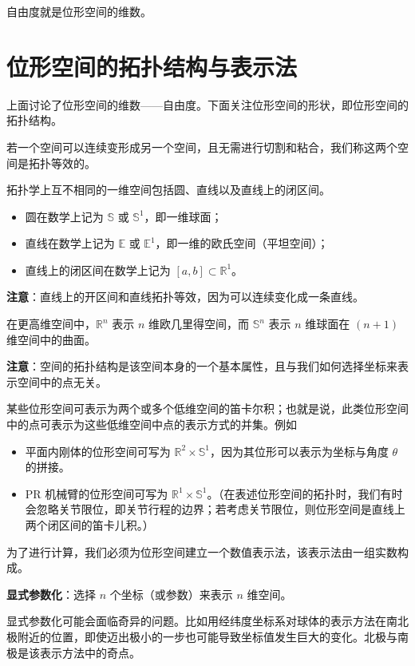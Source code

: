 自由度就是位形空间的维数。

\section{位形空间的拓扑结构与表示法}

上面讨论了位形空间的维数——自由度。下面关注位形空间的形状，即位形空间的拓扑结构。

\begin{definition}
	若一个空间可以连续变形成另一个空间，且无需进行切割和粘合，我们称这两个空间是拓扑等效的。
\end{definition}

拓扑学上互不相同的一维空间包括圆、直线以及直线上的闭区间。
\begin{itemize}
	\item 圆在数学上记为 $\mathbb{S}$ 或 $\mathbb{S}^{1}$，即一维球面；
	\item 直线在数学上记为 $\mathbb{E}$ 或 $\mathbb{E}^{1}$，即一维的欧氏空间（平坦空间）；
	\item 直线上的闭区间在数学上记为 $[a,b]\subset\mathbb{R}^{1}$。
\end{itemize}

\textbf{注意}：直线上的开区间和直线拓扑等效，因为可以连续变化成一条直线。

在更高维空间中，$\mathbb{R}^{n}$ 表示 $n$ 维欧几里得空间，而 $\mathbb{S}^{n}$ 表示 $n$ 维球面在 $(n+1)$ 维空间中的曲面。

\textbf{注意}：空间的拓扑结构是该空间本身的一个基本属性，且与我们如何选择坐标来表示空间中的点无关。

某些位形空间可表示为两个或多个低维空间的笛卡尔积；也就是说，此类位形空间中的点可表示为这些低维空间中点的表示方式的并集。例如
\begin{itemize}
	\item 平面内刚体的位形空间可写为 $\mathbb{R}^{2}\times\mathbb{S}^{1}$，因为其位形可以表示为坐标与角度 $\theta$ 的拼接。
	\item PR 机械臂的位形空间可写为 $\mathbb{R}^{1}\times\mathbb{S}^{1}$。（在表述位形空间的拓扑时，我们有时会忽略关节限位，即关节行程的边界；若考虑关节限位，则位形空间是直线上两个闭区间的笛卡儿积。）
\end{itemize}

为了进行计算，我们必须为位形空间建立一个数值表示法，该表示法由一组实数构成。

\textbf{显式参数化}：选择 $n$ 个坐标（或参数）来表示 $n$ 维空间。

显式参数化可能会面临奇异的问题。比如用经纬度坐标系对球体的表示方法在南北极附近的位置，即使迈出极小的一步也可能导致坐标值发生巨大的变化。北极与南极是该表示方法中的奇点。

